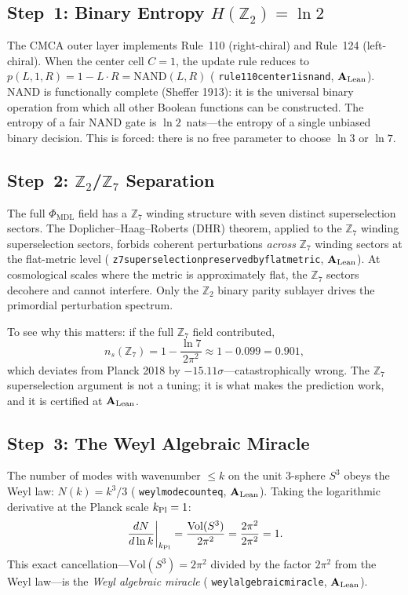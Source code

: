 \documentclass[11pt,openany]{book}
\theoremstyle{remark}
\newcommand{\PHIMDL}{\Phi_{\mathrm{MDL}}}
\newcommand{\ZS}{\mathbb{Z}_7}
\newcommand{\ZT}{\mathbb{Z}_2}
\newcommand{\lean}[1]{%
  \penalty-100
  \begingroup\def\_{\textunderscore\allowbreak}\texttt{#1}\endgroup}
\newcommand{\ns}{n_s}
\newcommand{\CatAL}{\ensuremath{\textbf{A}_{\rm Lean}}}
\begin{document}
\subsection*{Step~1: Binary Entropy $H(\mathbb{Z}_2) = \ln 2$}

The CMCA outer layer implements Rule~110 (right-chiral) and Rule~124 (left-chiral).
When the center cell $C = 1$, the update rule reduces to
$p(L,1,R) = 1 - L\cdot R = \mathrm{NAND}(L,R)$
(\lean{rule110\_center1\_is\_nand}, \CatAL).
NAND is functionally complete (Sheffer 1913): it is the universal binary operation
from which all other Boolean functions can be constructed.
The entropy of a fair NAND gate is $\ln 2$~nats---the entropy of a single unbiased
binary decision.
This is forced: there is no free parameter to choose $\ln 3$ or $\ln 7$.

\subsection*{Step~2: $\mathbb{Z}_2$/$\mathbb{Z}_7$ Separation}

The full $\PHIMDL$ field has a $\ZS$ winding structure with seven distinct
superselection sectors.
The Doplicher--Haag--Roberts (DHR) theorem, applied to the $\ZS$ winding
superselection sectors, forbids coherent perturbations \emph{across} $\ZS$ winding
sectors at the flat-metric level
(\lean{z7\_superselection\_preserved\_by\_flat\_metric}, \CatAL).
At cosmological scales where the metric is approximately flat, the $\ZS$ sectors
decohere and cannot interfere.
Only the $\ZT$ binary parity sublayer drives the primordial perturbation spectrum.

To see why this matters: if the full $\ZS$ field contributed,
\[
  \ns(\ZS)
  = 1 - \frac{\ln 7}{2\pi^2}
  \approx 1 - 0.099
  = 0.901,
\]
which deviates from Planck 2018 by $-15.11\sigma$---catastrophically wrong.
The $\ZS$ superselection argument is not a tuning; it is what makes the prediction work,
and it is certified at \CatAL.

\subsection*{Step~3: The Weyl Algebraic Miracle}

The number of modes with wavenumber $\leq k$ on the unit 3-sphere $S^3$ obeys
the Weyl law: $N(k) = k^3/3$ (\lean{weyl\_mode\_count\_eq}, \CatAL).
Taking the logarithmic derivative at the Planck scale $k_{\rm Pl} = 1$:
\[
  \left.\frac{dN}{d\ln k}\right|_{k_{\rm Pl}}
  = \frac{\mathrm{Vol}(S^3)}{2\pi^2}
  = \frac{2\pi^2}{2\pi^2}
  = 1.
\]
This exact cancellation---$\mathrm{Vol}(S^3) = 2\pi^2$ divided by the factor
$2\pi^2$ from the Weyl law---is the \emph{Weyl algebraic miracle}
(\lean{weyl\_algebraic\_miracle}, \CatAL).
\end{document}
